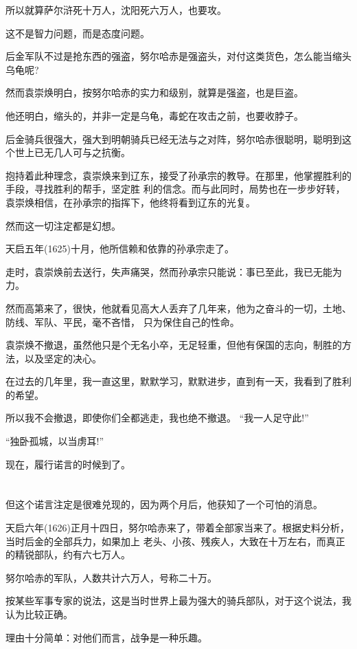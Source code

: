 \documentclass[11pt,a4paper,onecolumn]{article}
\begin{document}
所以就算萨尔浒死十万人，沈阳死六万人，也要攻。

这不是智力问题，而是态度问题。

后金军队不过是抢东西的强盗，努尔哈赤是强盗头，对付这类货色，怎么能当缩头乌龟呢?

然而袁崇焕明白，按努尔哈赤的实力和级别，就算是强盗，也是巨盗。

他还明白，缩头的，并非一定是乌龟，毒蛇在攻击之前，也要收脖子。

后金骑兵很强大，强大到明朝骑兵已经无法与之对阵，努尔哈赤很聪明，聪明到这个世上已无几人可与之抗衡。

抱持着此种理念，袁崇焕来到辽东，接受了孙承宗的教导。在那里，他掌握胜利的手段，寻找胜利的帮手，坚定胜
利的信念。而与此同时，局势也在一步步好转，袁崇焕相信，在孙承宗的指挥下，他终将看到辽东的光复。

然而这一切注定都是幻想。

天启五年(1625)十月，他所信赖和依靠的孙承宗走了。

走时，袁崇焕前去送行，失声痛哭，然而孙承宗只能说：事已至此，我已无能为力。

然而高第来了，很快，他就看见高大人丢弃了几年来，他为之奋斗的一切，土地、防线、军队、平民，毫不吝惜，
只为保住自己的性命。

袁崇焕不撤退，虽然他只是个无名小卒，无足轻重，但他有保国的志向，制胜的方法，以及坚定的决心。

在过去的几年里，我一直这里，默默学习，默默进步，直到有一天，我看到了胜利的希望。

所以我不会撤退，即使你们全都逃走，我也绝不撤退。 ``我一人足守此!''

``独卧孤城，以当虏耳!''

现在，履行诺言的时候到了。

\section[\thesection]{}

但这个诺言注定是很难兑现的，因为两个月后，他获知了一个可怕的消息。

天启六年(1626)正月十四日，努尔哈赤来了，带着全部家当来了。根据史料分析，当时后金的全部兵力，如果加上
老头、小孩、残疾人，大致在十万左右，而真正的精锐部队，约有六七万人。

努尔哈赤的军队，人数共计六万人，号称二十万。

按某些军事专家的说法，这是当时世界上最为强大的骑兵部队，对于这个说法，我认为比较正确。

理由十分简单：对他们而言，战争是一种乐趣。
\end{document}
